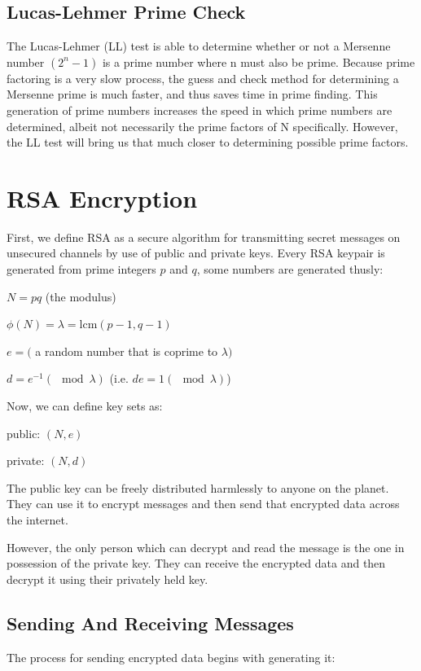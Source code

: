 \documentclass[a4paper,11pt]{article}
\theoremstyle{mytheor}
\begin{document}
\subsection{Lucas-Lehmer Prime Check}\label{sec:lehmer}
\cite{Prime}
The Lucas-Lehmer (LL) test is able to determine whether or not a Mersenne number $(2^n - 1)$ is a prime number where n must also be prime.  Because prime factoring is a very slow process, the guess and check method for determining a Mersenne prime is much faster, and thus saves time in prime finding.  This generation of prime numbers increases the speed in which prime numbers are determined, albeit not necessarily the prime factors of N specifically.  However, the LL test will bring us that much closer to determining possible prime factors.  


\section{RSA Encryption}\label{sec:rsa}

\cite{PCS} First, we define RSA as a secure algorithm for transmitting secret messages on unsecured channels by use of public and private keys. Every RSA keypair is generated from prime integers $p$ and $q$, some numbers are generated thusly:

$N=pq$ (the modulus)

$\phi(N) = \lambda = \mathrm{lcm}(p-1, q-1)$

$e = ($ a random number that is coprime to $\lambda)$

$d = e^{-1} (\mod \lambda)$ (i.e. $de = 1 (\mod \lambda)$)


Now, we can define key sets as:

public: $(N, e)$

private: $(N, d)$

The public key can be freely distributed harmlessly to anyone on the planet. They can use it to encrypt messages and then send that encrypted data across the internet.

However, the only person which can decrypt and read the message is the one in possession of the private key. They can receive the encrypted data and then decrypt it using their privately held key.

\subsection{Sending And Receiving Messages}

The process for sending encrypted data begins with generating it:
\end{document}
